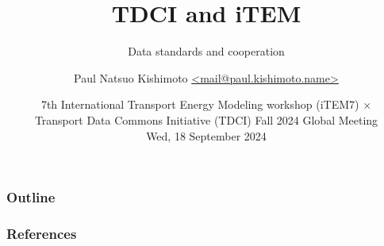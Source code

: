 \documentclass[12pt,aspectratio=169]{beamer}
\title{TDCI and iTEM}
\subtitle{Data standards and cooperation}
\date{
  \texorpdfstring{7th International Transport Energy Modeling workshop (iTEM7) ×\\
  Transport Data Commons Initiative (TDCI) Fall 2024 Global Meeting\\
  Wed, 18 September 2024}%
  {2024-09-18}}
\author{\texorpdfstring{Paul Natsuo Kishimoto\scriptsize\newline
  \href{mailto:mail@paul.kishimoto.name}%
       {\ttfamily <mail@paul.kishimoto.name>}}%
  {Paul Natsuo Kishimoto <mail@paul.kishimoto.name>}}
\begin{document}
\maketitle

\begin{frame}
\frametitle{Outline}

\tableofcontents

\end{frame}

\appendix

\begin{frame}
\frametitle{References}
\printbibliography
\end{frame}
\end{document}
